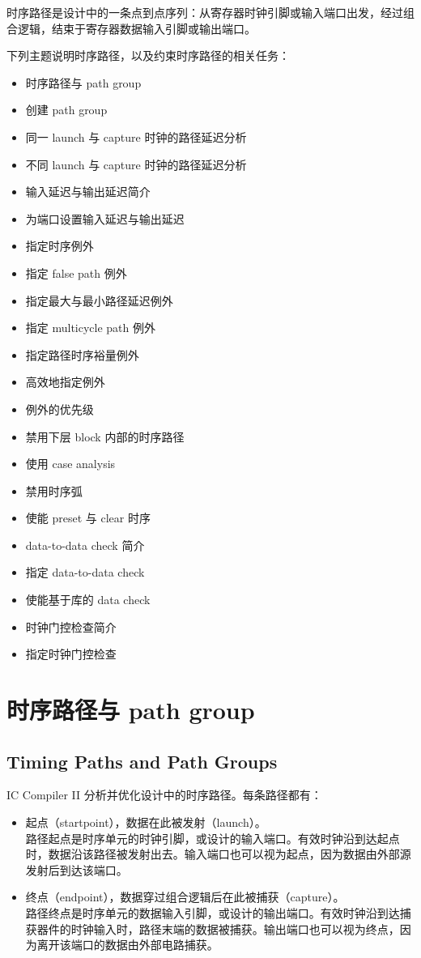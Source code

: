 \label{chap:paths}

时序路径是设计中的一条点到点序列：从寄存器时钟引脚或输入端口出发，经过组合逻辑，结束于寄存器数据输入引脚或输出端口。

下列主题说明时序路径，以及约束时序路径的相关任务：
\begin{itemize}
  \item 时序路径与 path group
  \item 创建 path group
  \item 同一 launch 与 capture 时钟的路径延迟分析
  \item 不同 launch 与 capture 时钟的路径延迟分析
  \item 输入延迟与输出延迟简介
  \item 为端口设置输入延迟与输出延迟
  \item 指定时序例外
  \item 指定 false path 例外
  \item 指定最大与最小路径延迟例外
  \item 指定 multicycle path 例外
  \item 指定路径时序裕量例外
  \item 高效地指定例外
  \item 例外的优先级
  \item 禁用下层 block 内部的时序路径
  \item 使用 case analysis
  \item 禁用时序弧
  \item 使能 preset 与 clear 时序
  \item data-to-data check 简介
  \item 指定 data-to-data check
  \item 使能基于库的 data check
  \item 时钟门控检查简介
  \item 指定时钟门控检查
\end{itemize}

\section{时序路径与 path group}
\subsection*{Timing Paths and Path Groups}

IC Compiler II 分析并优化设计中的时序路径。每条路径都有：
\begin{itemize}
  \item 起点（startpoint），数据在此被发射（launch）。\\
        路径起点是时序单元的时钟引脚，或设计的输入端口。有效时钟沿到达起点时，数据沿该路径被发射出去。输入端口也可以视为起点，因为数据由外部源发射后到达该端口。
  \item 终点（endpoint），数据穿过组合逻辑后在此被捕获（capture）。\\
        路径终点是时序单元的数据输入引脚，或设计的输出端口。有效时钟沿到达捕获器件的时钟输入时，路径末端的数据被捕获。输出端口也可以视为终点，因为离开该端口的数据由外部电路捕获。
\end{itemize}

